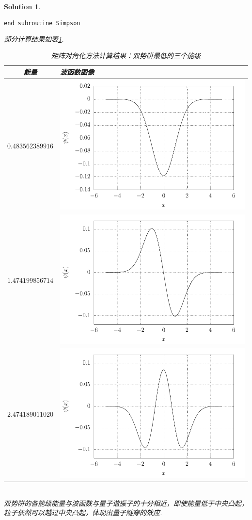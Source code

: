 \documentclass[UTF8,10pt,a4paper]{article}
\theoremstyle{Problem}
\theoremstyle{Solution}
\newtheorem*{sol}{Solution}
\begin{document}
\begin{sol}
\begin{lstlisting}
end subroutine Simpson
    \end{lstlisting}
    部分计算结果如表\ref{4-ExactDiagonalization}.
    \begin{table}[h]
        \centering
        \caption{矩阵对角化方法计算结果：双势阱最低的三个能级}
        \label{4-ExactDiagonalization}
        \begin{tabular}{cm{}}
        \hline
        能量 & 波函数图像 \\ \hline
        $0.483562389916$ & \includegraphics[width=.4\textwidth]{4-ExactDiagonalization-1.pdf} \\
        $1.474199856714$ & \includegraphics[width=.4\textwidth]{4-ExactDiagonalization-2.pdf} \\
        $2.474189011020$ & \includegraphics[width=.4\textwidth]{4-ExactDiagonalization-3.pdf} \\ \hline
        \end{tabular}
        \end{table}
        \\双势阱的各能级能量与波函数与量子谐振子的十分相近，即使能量低于中央凸起，粒子依然可以越过中央凸起，体现出量子隧穿的效应.
\end{sol}
\end{document}
